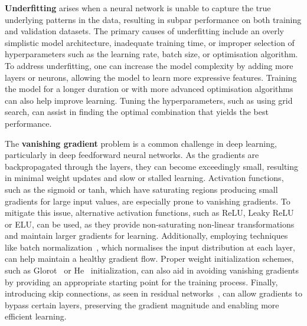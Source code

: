 \textbf{Underfitting} arises when a neural network is unable to capture the true underlying patterns in the data, resulting in subpar performance on both training and validation datasets. The primary causes of underfitting include an overly simplistic model architecture, inadequate training time, or improper selection of hyperparameters such as the learning rate, batch size, or optimisation algorithm. To address underfitting, one can increase the model complexity by adding more layers or neurons, allowing the model to learn more expressive features. Training the model for a longer duration or with more advanced optimisation algorithms can also help improve learning. Tuning the hyperparameters, such as using grid search, can assist in finding the optimal combination that yields the best performance.

The \textbf{vanishing gradient} problem is a common challenge in deep learning, particularly in deep feedforward neural networks. As the gradients are backpropagated through the layers, they can become exceedingly small, resulting in minimal weight updates and slow or stalled learning. Activation functions, such as the sigmoid or tanh, which have saturating regions producing small gradients for large input values, are especially prone to vanishing gradients. To mitigate this issue, alternative activation functions, such as ReLU, Leaky ReLU or ELU, can be used, as they provide non-saturating non-linear transformations and maintain larger gradients for learning. Additionally, employing techniques like batch normalization~\supercite{batchnorm1,batchnorm2,batchnorm3}, which normalises the input distribution at each layer, can help maintain a healthy gradient flow. Proper weight initialization schemes, such as Glorot~\supercite{glorot-init} or He~\supercite{he-init} initialization, can also aid in avoiding vanishing gradients by providing an appropriate starting point for the training process. Finally, introducing skip connections, as seen in residual networks~\supercite{residuals1,residuals2}, can allow gradients to bypass certain layers, preserving the gradient magnitude and enabling more efficient learning.

